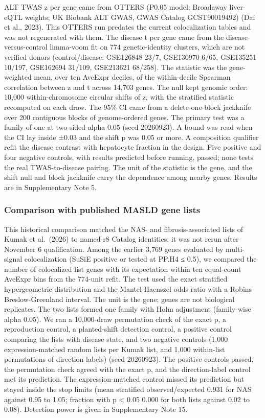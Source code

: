 ALT TWAS z per gene came from OTTERS (P0.05 model; Broadaway liver-eQTL weights; UK Biobank ALT GWAS, GWAS Catalog GCST90019492) (Dai et al., 2023). This OTTERS run predates the current colocalization tables and was not regenerated with them. The disease t per gene came from the disease-versus-control limma-voom fit on 774 genetic-identity clusters, which are not verified donors (control/disease: GSE126848 23/7, GSE130970 6/65, GSE135251 10/197, GSE162694 31/109, GSE213621 68/258). The statistic was the gene-weighted mean, over ten AveExpr deciles, of the within-decile Spearman correlation between z and t across 14,703 genes. The null kept genomic order: 10,000 within-chromosome circular shifts of z, with the stratified statistic recomputed on each draw. The 95\% CI came from a delete-one-block jackknife over 200 contiguous blocks of genome-ordered genes. The primary test was a family of one at two-sided alpha 0.05 (seed 20260923). A bound was read when the CI lay inside ±0.03 and the shift p was 0.05 or more. A composition qualifier refit the disease contrast with hepatocyte fraction in the design. Five positive and four negative controls, with results predicted before running, passed; none tests the real TWAS-to-disease pairing. The unit of the statistic is the gene, and the shift null and block jackknife carry the dependence among nearby genes. Results are in Supplementary Note 5.

\subsubsection{Comparison with published MASLD gene lists}\label{comparison-with-published-masld-gene-lists}

This historical comparison matched the NAS- and fibrosis-associated lists of Kumak et al.~(2026) to named-r8 Catalog identities; it was not rerun after November 6 qualification. Among the earlier 3,769 genes evaluated by multi-signal colocalization (SuSiE positive or tested at PP.H4 ≤ 0.5), we compared the number of colocalized list genes with its expectation within ten equal-count AveExpr bins from the 774-unit refit. The test used the exact stratified hypergeometric distribution and the Mantel-Haenszel odds ratio with a Robins-Breslow-Greenland interval. The unit is the gene; genes are not biological replicates. The two lists formed one family with Holm adjustment (family-wise alpha 0.05). We ran a 10,000-draw permutation check of the exact p, a reproduction control, a planted-shift detection control, a positive control comparing the lists with disease state, and two negative controls (1,000 expression-matched random lists per Kumak list, and 1,000 within-list permutations of direction labels) (seed 20260923). The positive controls passed, the permutation check agreed with the exact p, and the direction-label control met its prediction. The expression-matched control missed its prediction but stayed inside the stop limits (mean stratified observed/expected 0.931 for NAS against 0.95 to 1.05; fraction with p \textless{} 0.05 0.000 for both lists against 0.02 to 0.08). Detection power is given in Supplementary Note 15.

